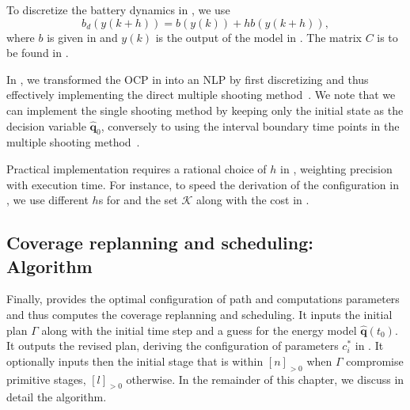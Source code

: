 To discretize the battery dynamics in , we use
\begin{equation}\label{eq:batt-euler}
  b_d(y(k+h))=b(y(k))+hb(y(k+h)),
\end{equation}
where $b$ is given in  and $y(k)$ is the output of the model in . The matrix $C$ is to be found in .

In , we transformed the OCP in  into an NLP by first discretizing and thus effectively implementing the direct multiple shooting method~\citep{rawlings2017model}. We note that we can implement the single shooting method by keeping only the initial state as the decision variable $\hat{\mathbf{q}}_0$, conversely to using the interval boundary time points in the multiple shooting method~\citep{rawlings2017model}.

Practical implementation requires a rational choice of $h$ in , weighting precision with execution time. For instance, to speed the derivation of the configuration in , we use different $h$s for  and the set $\mathcal{K}$ along with the cost in .

\subsection{Coverage replanning and scheduling: Algorithm}
\label{sec:algo}

Finally,  provides the optimal configuration of path and computations parameters and thus computes the coverage replanning and scheduling. It inputs the initial plan $\Gamma$ along with the initial time step and a guess for the energy model $\hat{\mathbf{q}}(t_0)$. It outputs the revised plan, deriving the configuration of parameters $c_i^*$ in . It optionally inputs then the initial stage that is within $[n]_{>0}$ when $\Gamma$ compromise primitive stages, $[l]_{>0}$ otherwise. In the remainder of this chapter, we discuss in detail the algorithm.

